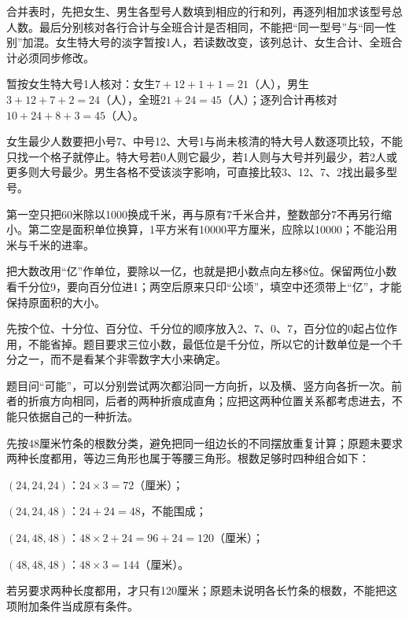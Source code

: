 \documentclass[multi=snippet,border=0pt]{standalone}
\newenvironment{snippet}[3]{\begin{minipage}{#1bp}\color{answerred}\fontsize{#2}{#3}\selectfont\raggedright}{\end{minipage}}
\begin{document}
\begin{snippet}{505}{11.5}{14}合并表时，先把女生、男生各型号人数填到相应的行和列，再逐列相加求该型号总人数。最后分别核对各行合计与全班合计是否相同，不能把“同一型号”与“同一性别”加混。女生特大号的淡字暂按1人，若读数改变，该列总计、女生合计、全班合计必须同步修改。\par 暂按女生特大号1人核对：女生\(7+12+1+1=21\)（人），男生\(3+12+7+2=24\)（人），全班\(21+24=45\)（人）；逐列合计再核对\(10+24+8+3=45\)（人）。\end{snippet}
\begin{snippet}{505}{11.5}{14}女生最少人数要把小号7、中号12、大号1与尚未核清的特大号人数逐项比较，不能只找一个格子就停止。特大号若0人则它最少，若1人则与大号并列最少，若2人或更多则大号最少。男生各格不受该淡字影响，可直接比较3、12、7、2找出最多型号。\end{snippet}
\begin{snippet}{505}{11.5}{14}第一空只把60米除以1000换成千米，再与原有7千米合并，整数部分7不再另行缩小。第二空是面积单位换算，1平方米有10000平方厘米，应除以10000；不能沿用米与千米的进率。\end{snippet}
\begin{snippet}{505}{11.5}{14}把大数改用“亿”作单位，要除以一亿，也就是把小数点向左移8位。保留两位小数看千分位9，要向百分位进1；两空后原来只印“公顷”，填空中还须带上“亿”，才能保持原面积的大小。\end{snippet}
\begin{snippet}{505}{11.5}{14}先按个位、十分位、百分位、千分位的顺序放入2、7、0、7，百分位的0起占位作用，不能省掉。题目要求三位小数，最低位是千分位，所以它的计数单位是一个千分之一，而不是看某个非零数字大小来确定。\end{snippet}
\begin{snippet}{505}{11.5}{14}题目问“可能”，可以分别尝试两次都沿同一方向折，以及横、竖方向各折一次。前者的折痕方向相同，后者的两种折痕成直角；应把这两种位置关系都考虑进去，不能只依据自己的一种折法。\end{snippet}
\begin{snippet}{505}{11.5}{14}先按48厘米竹条的根数分类，避免把同一组边长的不同摆放重复计算；原题未要求两种长度都用，等边三角形也属于等腰三角形。根数足够时四种组合如下：\par \((24,24,24)\)：\(24\times3=72\)（厘米）；\par \((24,24,48)\)：\(24+24=48\)，不能围成；\par \((24,48,48)\)：\(48\times2+24=96+24=120\)（厘米）；\par \((48,48,48)\)：\(48\times3=144\)（厘米）。\par 若另要求两种长度都用，才只有120厘米；原题未说明各长竹条的根数，不能把这项附加条件当成原有条件。\end{snippet}
\end{document}
